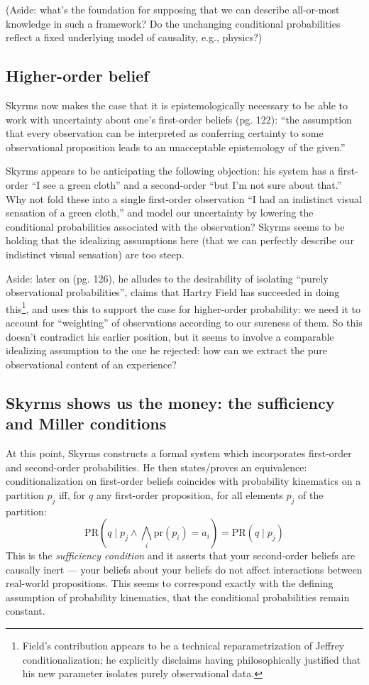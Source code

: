 \documentclass[letterpaper,12pt]{article}
\begin{document}
(Aside: what's the foundation for supposing that we can describe all-or-most knowledge in such a framework? Do the unchanging conditional probabilities reflect a fixed underlying model of causality, e.g., physics?)
\subsection{Higher-order belief}
Skyrms now makes the case that it is epistemologically necessary to be able to work with uncertainty about one's first-order beliefs (pg. 122): ``the assumption that every observation can be interpreted as conferring certainty to some observational proposition leads to an unacceptable epistemology of the given.''

Skyrms appears to be anticipating the following objection: his system has a first-order ``I see a green cloth'' and a second-order ``but I'm not sure about that.'' Why not fold these into a single first-order observation ``I had an indistinct visual sensation of a green cloth,'' and model our uncertainty by lowering the conditional probabilities associated with the observation? Skyrms seems to be holding that the idealizing assumptions here (that we can perfectly describe our indistinct visual sensation) are too steep.

Aside: later on (pg. 126), he alludes to the desirability of isolating ``purely observational probabilities'', claims that Hartry Field has succeeded in doing this\footnote{Field's contribution appears to be a technical reparametrization of Jeffrey conditionalization; he explicitly disclaims having philosophically justified that his new parameter isolates purely observational data.}, and uses this to support the case for higher-order probability: we need it to account for ``weighting'' of observations according to our sureness of them. So this doesn't contradict his earlier position, but it seems to involve a comparable idealizing assumption to the one he rejected: how can we extract the pure observational content of an experience?

\subsection{Skyrms shows us the money: the sufficiency and Miller conditions}
At this point, Skyrms constructs a formal system which incorporates first-order and second-order probabilities. He then states/proves an equivalence: conditionalization on first-order beliefs coincides with probability kinematics on a partition $p_j$ iff, for $q$ any first-order proposition, for all elements $p_j$ of the partition:
$$\text{PR}(q \mid p_j \land \bigwedge_i \text{pr}(p_i) = a_i) = \text{PR}(q \mid p_j)$$
This is the \emph{sufficiency condition} and it asserts that your second-order beliefs are causally inert --- your beliefs about your beliefs do not affect interactions between real-world propositions. This seems to correspond exactly with the defining assumption of probability kinematics, that the conditional probabilities remain constant.
\end{document}
